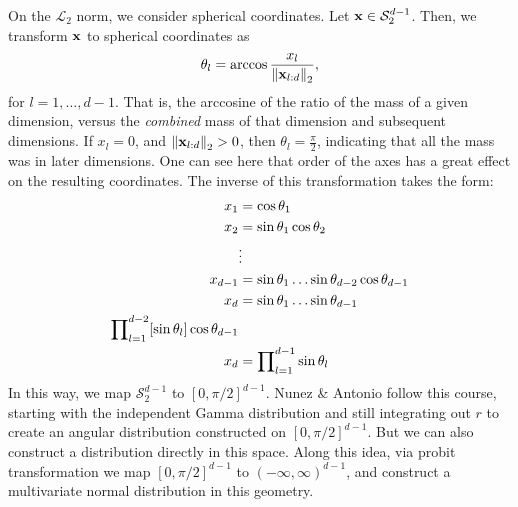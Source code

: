 On the $\mathcal{L}_2$ norm, we consider spherical coordinates.  Let ${\bf x} \in \mathcal{S}_{2}^{d-1}$.
  Then, we transform ${\bf x}$ to spherical coordinates as
  \begin{equation*}
    \theta_l = \arccos\frac{x_l}{\left\lVert {\bf x}_{l:d} \right\rVert_{2}},
  \end{equation*}
  for $l = 1,\ldots, d-1$. That is, the arccosine of the ratio of the mass of a given dimension,
  versus the \emph{combined} mass of that dimension and subsequent dimensions.  If $x_l = 0$, and
  $\left\lVert {\bf x}_{l:d} \right\rVert_{2} > 0$, then $\theta_l = \frac{\pi}{2}$, indicating that all the mass was
  in later dimensions.  One can see here that order of the axes has a great effect on the resulting
  coordinates.  The inverse of this transformation takes the form:
  \begin{equation}
    \label{eqn:sperical}
    \begin{aligned}
      x_1 &= \cos\theta_1\\
      x_2 &= \sin\theta_1\cos\theta_2\\
      &\vdots\\
      x_{d-1} &= \sin\theta_1\ldots\sin\theta_{d-2}\cos\theta_{d-1}\\
      x_d &= \sin\theta_1\ldots\sin\theta_{d-1}\\
      {\small \prod}_{l = 1}^{d-2}[\sin\theta_{l}]\cos\theta_{d-1}\\
      x_d &= {\small \prod}_{l = 1}^{d-1}\sin\theta_l
    \end{aligned}
  \end{equation}
  In this way, we map $\mathcal{S}_2^{d-1}$ to $[0,\pi/2]^{d-1}$. Nunez \& Antonio\cite{nunez2019}
  follow this course, starting with the independent Gamma distribution and still integrating out
  $r$ to create an angular distribution constructed on $[0,\pi/2]^{d-1}$. But we can also construct
  a distribution directly in this space.  Along this idea, via probit transformation we map
  $[0,\pi/2]^{d-1}$ to $(-\infty, \infty)^{d-1}$, and construct a multivariate normal distribution
  in this geometry.

